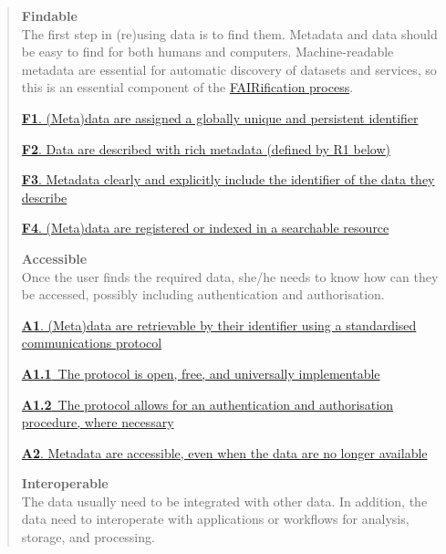 \documentclass[
]{book}
\begin{document}
\begin{quote}
\textbf{Findable}\\
The first step in (re)using data is to find them. Metadata and data should be easy to find for both humans and computers. Machine-readable metadata are essential for automatic discovery of datasets and services, so this is an essential component of the \href{https://www.go-fair.org/fair-principles/fairification-process/}{FAIRification process}.

\href{https://www.go-fair.org/fair-principles/fair-data-principles-explained/f1-meta-data-assigned-globally-unique-persistent-identifiers/}{\textbf{F1}. (Meta)data are assigned a globally unique and persistent identifier}

\href{https://www.go-fair.org/fair-principles/fair-data-principles-explained/f2-data-described-rich-metadata/}{\textbf{F2}. Data are described with rich metadata (defined by R1 below)}

\href{https://www.go-fair.org/fair-principles/f3-metadata-clearly-explicitly-include-identifier-data-describe/}{\textbf{F3}. Metadata clearly and explicitly include the identifier of the data they describe}

\href{https://www.go-fair.org/fair-principles/f4-metadata-registered-indexed-searchable-resource/}{\textbf{F4}. (Meta)data are registered or indexed in a searchable resource}

\textbf{Accessible}\\
Once the user finds the required data, she/he needs to know how can they be accessed, possibly including authentication and authorisation.

\href{https://www.go-fair.org/fair-principles/542-2/}{\textbf{A1}. (Meta)data are retrievable by their identifier using a standardised communications protocol}

\href{https://www.go-fair.org/fair-principles/a1-1-protocol-open-free-universally-implementable/}{\textbf{A1.1}~The protocol is open, free, and universally implementable}

\href{https://www.go-fair.org/fair-principles/a1-2-protocol-allows-authentication-authorisation-required/}{\textbf{A1.2}~The protocol allows for an authentication and authorisation procedure, where necessary}

\href{https://www.go-fair.org/fair-principles/a2-metadata-accessible-even-data-no-longer-available/}{\textbf{A2}. Metadata are accessible, even when the data are no longer available}

\textbf{Interoperable}\\
The data usually need to be integrated with other data. In addition, the data need to interoperate with applications or workflows for analysis, storage, and processing.


\end{quote}
\end{document}
